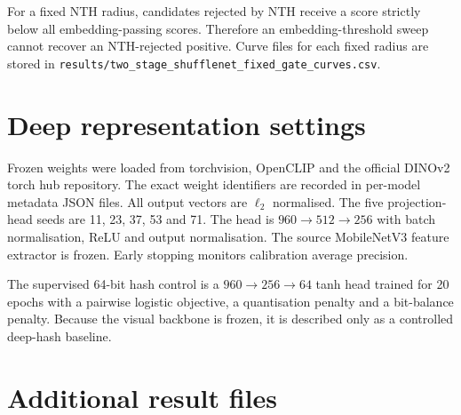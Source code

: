 \documentclass[11pt]{article}
\begin{document}
For a fixed NTH radius, candidates rejected by NTH receive a score strictly below all embedding-passing scores. Therefore an embedding-threshold sweep cannot recover an NTH-rejected positive. Curve files for each fixed radius are stored in \texttt{results/two\_stage\_shufflenet\_fixed\_gate\_curves.csv}.

\section{Deep representation settings}

Frozen weights were loaded from torchvision, OpenCLIP and the official DINOv2 torch hub repository. The exact weight identifiers are recorded in per-model metadata JSON files. All output vectors are $\ell_2$ normalised. The five projection-head seeds are 11, 23, 37, 53 and 71. The head is $960\rightarrow512\rightarrow256$ with batch normalisation, ReLU and output normalisation. The source MobileNetV3 feature extractor is frozen. Early stopping monitors calibration average precision.

The supervised 64-bit hash control is a $960\rightarrow256\rightarrow64$ tanh head trained for 20 epochs with a pairwise logistic objective, a quantisation penalty and a bit-balance penalty. Because the visual backbone is frozen, it is described only as a controlled deep-hash baseline.

\section{Additional result files}
\end{document}
